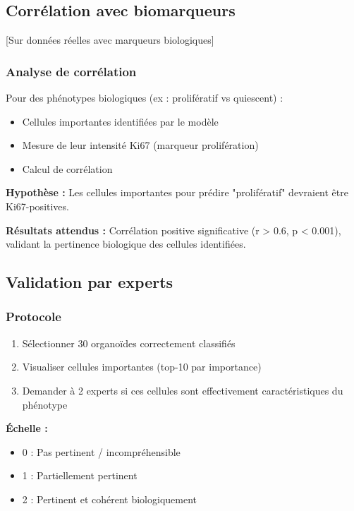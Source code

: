 \subsection{Corrélation avec biomarqueurs}

[Sur données réelles avec marqueurs biologiques]

\subsubsection{Analyse de corrélation}

Pour des phénotypes biologiques (ex : prolifératif vs quiescent) :
\begin{itemize}
    \item Cellules importantes identifiées par le modèle
    \item Mesure de leur intensité Ki67 (marqueur prolifération)
    \item Calcul de corrélation
\end{itemize}

\textbf{Hypothèse :}
Les cellules importantes pour prédire "prolifératif" devraient être Ki67-positives.

\textbf{Résultats attendus :}
Corrélation positive significative (r > 0.6, p < 0.001), validant la pertinence biologique des cellules identifiées.

\subsection{Validation par experts}

\subsubsection{Protocole}

\begin{enumerate}
    \item Sélectionner 30 organoïdes correctement classifiés
    \item Visualiser cellules importantes (top-10 par importance)
    \item Demander à 2 experts si ces cellules sont effectivement caractéristiques du phénotype
\end{enumerate}

\textbf{Échelle :}
\begin{itemize}
    \item 0 : Pas pertinent / incompréhensible
    \item 1 : Partiellement pertinent
    \item 2 : Pertinent et cohérent biologiquement
\end{itemize}

